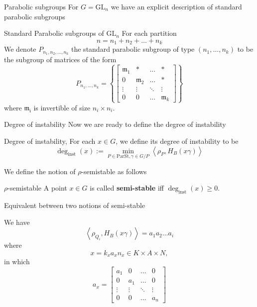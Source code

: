 \documentclass[pdf]{beamer}
\begin{document}
\begin{frame}{Parabolic subgroups}
    For $G =\text{GL}_n$ we have an explicit description of standard parabolic subgroups
    \pause\begin{block}{Standard Parabolic subgroups of $\text{GL}_n$}
        For each partition
        $$n = n_1+n_2+\ldots+n_k$$
        We denote $P_{n_1,n_2,\ldots,n_k}$ the standard parabolic subgroup of type $(n_1,\ldots, n_k)$ to be the subgroup of
        matrices of the form
        \[P_{n_1,\ldots, n_k} = \left\lbrace \begin{bmatrix}
                \mathfrak{m}_1 & \ast           & \ldots & \ast           \\
                0              & \mathfrak{m}_2 & \ldots & \ast           \\
                \vdots         & \vdots         & \ddots & \vdots         \\
                0              & 0              & \ldots & \mathfrak{m}_k
            \end{bmatrix} \right\rbrace\]
        where $\mathfrak{m_i}$ is invertible of size $n_i \times n_i$.
    \end{block}
\end{frame}
\begin{frame}{Degree of instability}
    Now we are ready to define the degree of instability
    \begin{block}{Degree of instability, \cite{chaudouard2016variante}}
        For each $x \in G$, we define its degree of instability to be
        \[\deg_{\text{inst}}(x):= \min_{P \in \text{ParSt}, \gamma \in G/P}\left\langle\rho_P, H_B(x\gamma) \right\rangle \]
    \end{block}\pause
    We define the notion of $\rho$-semistable as follows
    \begin{block}{$\rho$-semistable}
        A point $x \in G$ is called \textbf{semi-stable} iff $\deg_{\text{inst}}(x) \ge 0$.
    \end{block}
\end{frame}
\begin{frame}{Equivalent between two notions of semi-stable}

    We have
    \[\left\langle \rho_{Q_i}, H_B(x\gamma)   \right\rangle = a_1a_2\ldots a_i\]\pause
    where
    \[x = k_xa_xn_x \in K \times A \times N,\]
    in which
    \[a_x = \begin{bmatrix}
            a_1    & 0      & \ldots & 0      \\
            0      & a_1    & \ldots & 0      \\
            \vdots & \vdots & \ddots & \vdots \\
            0      & 0      & \ldots & a_n
        \end{bmatrix}\]
\end{frame}
\end{document}

